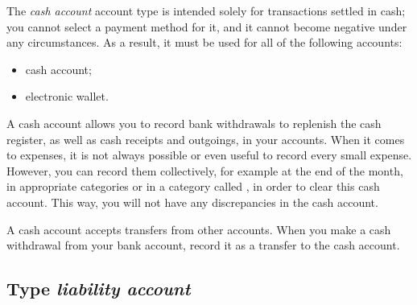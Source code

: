 The \emph{cash account} account type is intended solely for transactions settled in cash; you cannot select a payment method for it, and it cannot become negative under any circumstances. As a result, it must be used for all of the following accounts:
\begin{itemize}
	\item cash account;
	\item electronic wallet.
\end{itemize}
A cash account allows you to record bank withdrawals to replenish the cash register, as well as cash receipts and outgoings, in your accounts. When it comes to expenses, it is not always possible or even useful to record every small expense. However, you can record them collectively, for example at the end of the month, in appropriate categories or in a category called , in order to clear this cash account. This way, you will not have any discrepancies in the cash account.

A cash account accepts transfers from other accounts. When you make a cash withdrawal from your bank account, record it as a transfer to the cash account.


\subsection{Type \emph{liability account}\label{accounts-type-liabilities}}

